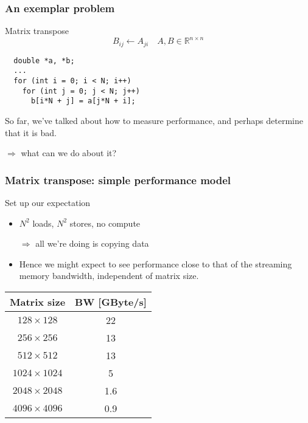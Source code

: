 \documentclass[presentation,aspectratio=43,10pt]{beamer}
\date{}
\begin{document}
\begin{frame}
  \maketitle
\end{frame}

\begin{frame}[fragile]
  \frametitle{An exemplar problem}
  \begin{block}{Matrix transpose}
    \begin{equation*}
      B_{ij} \gets A_{ji} \quad A, B \in \mathbb{R}^{n\times n}
    \end{equation*}
\begin{verbatim}
  double *a, *b;
  ...
  for (int i = 0; i < N; i++)
    for (int j = 0; j < N; j++)
      b[i*N + j] = a[j*N + i];
\end{verbatim}
  \end{block}

  So far, we've talked about how to measure performance, and perhaps
  determine that it is bad.

  $\Rightarrow$ what can we do about it?
\end{frame}

\begin{frame}
  \frametitle{Matrix transpose: simple performance model}
  \begin{exampleblock}{Set up our expectation}
    \begin{itemize}
    \item $N^2$ loads, $N^2$ stores, no compute
    \item[$\Rightarrow$] all we're doing is copying data
    \item Hence we might expect to see performance close to that of the
      streaming memory bandwidth, independent of matrix size.
    \end{itemize}
  \end{exampleblock}
  \pause
  \begin{center}
    \begin{tabular}{cc}
      \toprule
      Matrix size & BW [GByte/s]\\
      \midrule
      $128\times 128$ & 22\\
      $256 \times 256$ & 13\\
      $512 \times 512$ & 13\\
      $1024 \times 1024$ & 5\\
      $2048 \times 2048$ & 1.6\\
      $4096 \times 4096$ & 0.9\\
      \bottomrule
    \end{tabular}
  \end{center}
\end{frame}
\end{document}
